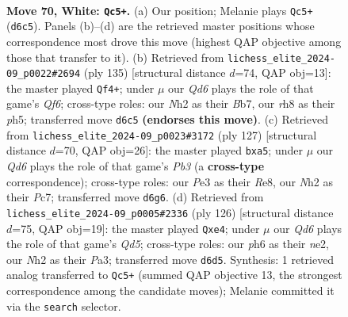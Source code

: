 \documentclass[11pt]{article}
\begin{document}
\clearpage

\begin{figure}[p]\centering
\begin{subfigure}{0.46\textwidth}\centering
\resizebox{\linewidth}{!}{%
\newchessgame
\chessboard[
  setfen={5r1r/p5p1/3Q3p/k2p3P/p2P2P1/1q2P3/7N/4b2K w - - 48 70},
  showmover=false,
  pgfstyle=straightmove, color=movearrow, markmove={d6-c5}
]}
\caption{}
\end{subfigure}\hfill
\begin{subfigure}{0.46\textwidth}\centering
\resizebox{\linewidth}{!}{%
\newchessgame
\chessboard[
  setfen={8/1b4pk/4p3/1pP1P1pP/1P4P1/5q2/7K/4Q1R1 b - - 3 68},
  showmover=false,
  pgfstyle=straightmove, color=movearrow, markmove={f3-f4}
]}
\caption{}
\end{subfigure}
\\[4pt]
\begin{subfigure}{0.46\textwidth}\centering
\resizebox{\linewidth}{!}{%
\newchessgame
\chessboard[
  setfen={4r1k1/2p5/1p1p2P1/PP6/7p/P1q4P/2B2RP1/5R1K b - - 0 64},
  showmover=false,
  pgfstyle=straightmove, color=movearrow, markmove={b6-a5}
]}
\caption{}
\end{subfigure}\hfill
\begin{subfigure}{0.46\textwidth}\centering
\resizebox{\linewidth}{!}{%
\newchessgame
\chessboard[
  setfen={4rb1k/1p4pp/p7/3Q1PP1/1P2r3/P4K2/4n3/8 w - - 3 64},
  showmover=false,
  pgfstyle=straightmove, color=movearrow, markmove={d5-e4}
]}
\caption{}
\end{subfigure}
\caption{\textbf{Move 70, White: \texttt{Qc5+}.} (a) Our position; Melanie plays \texttt{Qc5+} (\texttt{d6c5}). Panels (b)--(d) are the retrieved master positions whose correspondence most drove this move (highest QAP objective among those that transfer to it). (b) Retrieved from \texttt{lichess\_elite\_2024-09\_p0022\#2694} (ply 135) [structural distance $d$=74, QAP obj=13]: the master played \texttt{Qf4+}; under $\mu$ our \emph{Qd6} plays the role of that game's \emph{Qf6}; cross-type roles: our \emph{N}h2 as their \emph{B}b7, our \emph{r}h8 as their \emph{p}h5; transferred move \texttt{d6c5} \textbf{(endorses this move)}. (c) Retrieved from \texttt{lichess\_elite\_2024-09\_p0023\#3172} (ply 127) [structural distance $d$=70, QAP obj=26]: the master played \texttt{bxa5}; under $\mu$ our \emph{Qd6} plays the role of that game's \emph{Pb3} (a \textbf{cross-type} correspondence); cross-type roles: our \emph{P}e3 as their \emph{R}e8, our \emph{N}h2 as their \emph{P}c7; transferred move \texttt{d6g6}. (d) Retrieved from \texttt{lichess\_elite\_2024-09\_p0005\#2336} (ply 126) [structural distance $d$=75, QAP obj=19]: the master played \texttt{Qxe4}; under $\mu$ our \emph{Qd6} plays the role of that game's \emph{Qd5}; cross-type roles: our \emph{p}h6 as their \emph{n}e2, our \emph{N}h2 as their \emph{P}a3; transferred move \texttt{d6d5}. Synthesis: 1 retrieved analog transferred to \texttt{Qc5+} (summed QAP objective 13, the strongest correspondence among the candidate moves); Melanie committed it via the \texttt{search} selector.}
\label{fig:thought-m138}
\end{figure}
\end{document}

